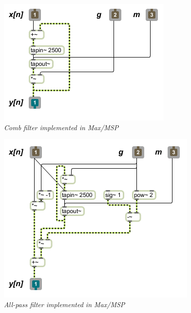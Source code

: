 \documentclass[12pt]{report}
\begin{document}
\pagebreak

\begin{figure}
  \centering
  \includegraphics[scale=0.5]{images/filt.comb.png}
  \caption{\emph{Comb filter implemented in Max/MSP}}
  \label{max:comb}
\end{figure}
\begin{figure}
  \centering
  \includegraphics[scale=0.5]{images/filt.allpass.png}
  \caption{\emph{All-pass filter implemented in Max/MSP}}
  \label{max:comb}
\end{figure}





%
%


\end{document}
